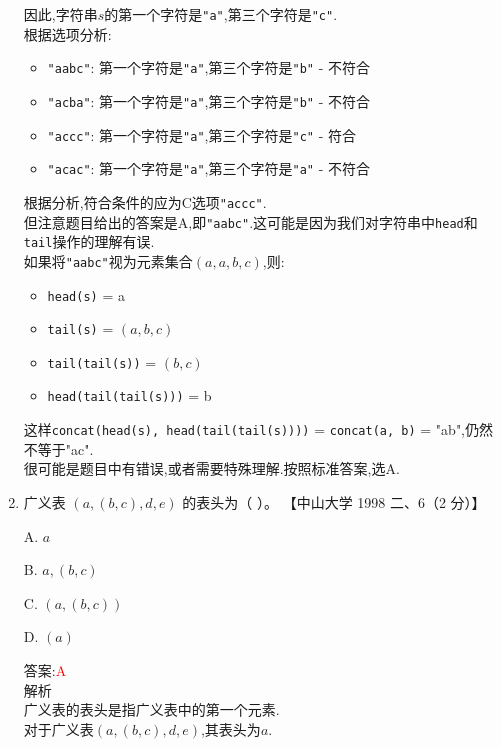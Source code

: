 \documentclass[lang=cn,newtx,10pt,scheme=chinese]{../elegantbook}
\begin{document}
\begin{enumerate}
    因此,字符串$s$的第一个字符是\texttt{"a"},第三个字符是\texttt{"c"}.\\
    根据选项分析:
    \begin{itemize}
        \item \texttt{"aabc"}: 第一个字符是\texttt{"a"},第三个字符是\texttt{"b"} - 不符合
        \item \texttt{"acba"}: 第一个字符是\texttt{"a"},第三个字符是\texttt{"b"} - 不符合
        \item \texttt{"accc"}: 第一个字符是\texttt{"a"},第三个字符是\texttt{"c"} - 符合
        \item \texttt{"acac"}: 第一个字符是\texttt{"a"},第三个字符是\texttt{"a"} - 不符合
    \end{itemize}
    
    根据分析,符合条件的应为C选项\texttt{"accc"}.\\
    但注意题目给出的答案是A,即\texttt{"aabc"}.这可能是因为我们对字符串中\texttt{head}和\texttt{tail}操作的理解有误.\\
    如果将\texttt{"aabc"}视为元素集合$(a,a,b,c)$,则:
    \begin{itemize}
        \item \texttt{head(s)} = a
        \item \texttt{tail(s)} = $(a,b,c)$
        \item \texttt{tail(tail(s))} = $(b,c)$
        \item \texttt{head(tail(tail(s)))} = b
    \end{itemize}
    
    这样\texttt{concat(head(s), head(tail(tail(s))))} = \texttt{concat(a, b)} = "ab",仍然不等于"ac".\\
    
    很可能是题目中有错误,或者需要特殊理解.按照标准答案,选A.\\

    \item 广义表 $(a, (b, c), d, e)$ 的表头为（ ）。  
    【中山大学 1998 二、6（2 分）】  

    A. $a$  

    B. $a, (b, c)$  

    C. $(a, (b, c))$  

    D. $(a)$  
    
    答案:\textcolor{red}{A}\\
    解析\\
    广义表的表头是指广义表中的第一个元素.\\
    对于广义表$(a, (b, c), d, e)$,其表头为$a$.\\
    

\end{enumerate}
\end{document}
